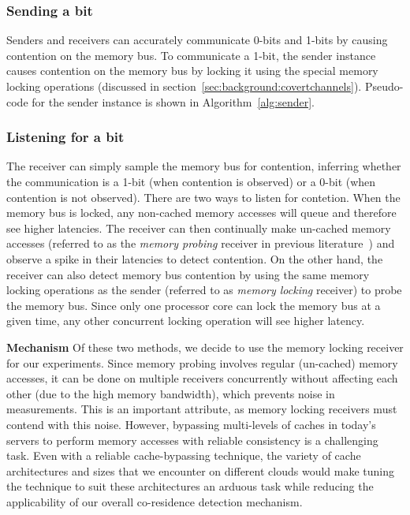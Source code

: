 \subsubsection{Sending a bit}
Senders and receivers can accurately communicate 0-bits and 1-bits
by causing contention on the memory bus. To communicate a 1-bit, the sender 
instance causes contention on the memory bus by locking it using the special memory locking operations
(discussed in section~\ref{sec:background:covertchannels}). 
Pseudo-code for the sender instance is shown in Algorithm~\ref{alg:sender}.

\subsubsection{Listening for a bit}
The receiver can simply sample the memory bus for contention, inferring whether 
the communication is a 1-bit (when contention is observed) or a 0-bit 
(when contention is not observed). There are two ways to listen for contetion. 
When the memory bus is locked, any
non-cached memory accesses will queue and therefore see higher latencies.  The
receiver can then continually make un-cached memory accesses (referred to as the
\textit{memory probing} receiver in previous literature~\cite{varadarajan2015})
and observe a spike in their latencies to detect contention. On the other hand,
the receiver can also detect memory bus contention by using the same memory
locking operations as the sender (referred to as \textit{memory locking}
receiver) to probe the memory bus. Since only one processor core can lock the
memory bus at a given time, any other concurrent locking operation will see
higher latency. 

\textbf{Mechanism} Of these two methods, we decide to use the memory locking receiver for our
experiments.  
Since memory probing involves regular (un-cached) memory accesses, it can be done
on multiple receivers concurrently without affecting each other (due to the high
memory bandwidth), which prevents noise in measurements. This is an important
attribute, as memory locking receivers must contend with this noise. However,
bypassing multi-levels of caches in today's servers to perform memory accesses
with reliable consistency is a challenging task. Even with a reliable
cache-bypassing technique, the variety of cache architectures and sizes that we
encounter on different clouds would make tuning the technique to suit these
architectures an arduous task while reducing the applicability of our overall
co-residence detection mechanism. 


